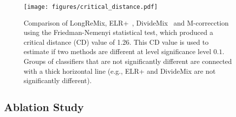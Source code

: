 \documentclass[review]{elsarticle}
\begin{document}
\begin{figure}[!t]
\centering
\texttt{[image: figures/critical\_distance.pdf]}
\caption{Comparison of  LongReMix, ELR+~\cite{liu2020early}, DivideMix~\cite{li2020dividemix} and M-correcction~\cite{arazo2019unsupervised} using the Friedman-Nemenyi statistical test, which produced a critical distance (CD) value of 1.26. 
This CD value is used to estimate if two methods are  different at level significance level $0.1$. 
Groups of classifiers that are not significantly different are connected with a thick horizontal line (e.g., ELR+ and DivideMix are not significantly different).}
\label{fig:critical_distance}
\end{figure}

\subsection{Ablation Study}
\end{document}
